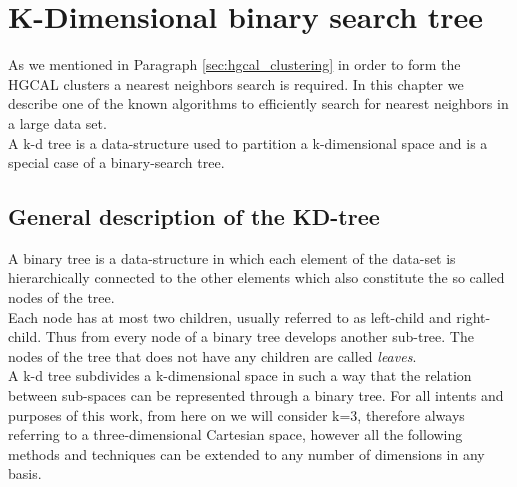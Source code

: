 \chapter{K-Dimensional binary search tree}\label{ch:volume_kd}
As we mentioned in Paragraph \ref{sec:hgcal_clustering} in order to form the HGCAL clusters a nearest neighbors search is required. In this chapter we describe one of the known algorithms to efficiently search for nearest neighbors in a large data set.\\
A k-d tree is a data-structure used to partition a k-dimensional space and is a special case of a binary-search tree.

\section{General description of the KD-tree}
A binary tree is a data-structure in which each element of the data-set is hierarchically connected to the other elements which also constitute the so called nodes of the tree.\\
Each node has at most two children, usually referred to as left-child and right-child. Thus from every node of a binary tree develops another sub-tree. The nodes of the tree that does not have any children are called \textit{leaves}.\\
A k-d tree subdivides a k-dimensional space in such a way that the relation between sub-spaces can be represented through a binary tree.
For all intents and purposes of this work, from here on we will consider k=3, therefore always referring to a three-dimensional Cartesian space, however all the following methods and techniques can be extended to any number of dimensions in any basis.
  
